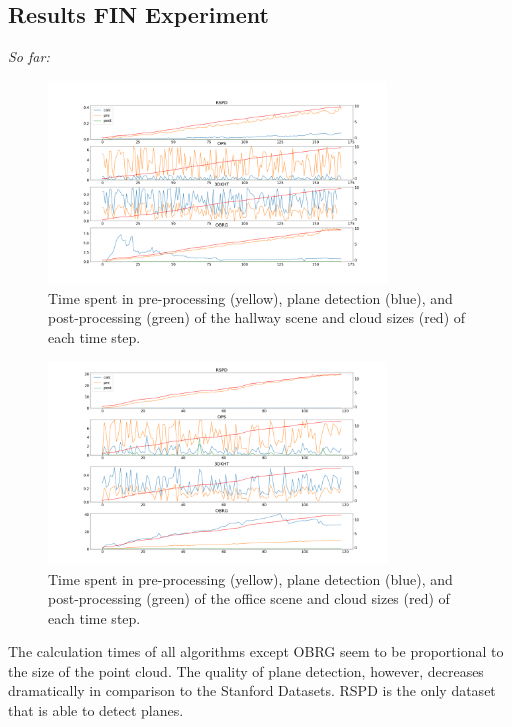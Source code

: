 \documentclass[main.tex]{subfiles}
\begin{document}
\subsection{Results FIN Experiment}
\textit{So far:}
\begin{figure}[H]
    \centering
    \includegraphics[width=0.8\textwidth]{images/dyn_time-hallway.png}
    \caption[Time Results Hallway]{Time spent in pre-processing (yellow), plane detection (blue), and post-processing (green) of the hallway scene and cloud sizes (red) of each time step.}
    \label{fig:dynhallway}
\end{figure}

\begin{figure}[H]
    \centering
    \includegraphics[width=0.8\textwidth]{images/dyn_time-office.png}
    \caption[Time Results office]{Time spent in pre-processing (yellow), plane detection (blue), and post-processing (green) of the office scene and cloud sizes (red) of each time step.}
    \label{fig:dynoffice}
\end{figure}

The calculation times of all algorithms except OBRG seem to be proportional to the size of the point cloud.
The quality of plane detection, however, decreases dramatically in comparison to the Stanford Datasets. RSPD is the only dataset that
is able to detect planes. %
\end{document}

